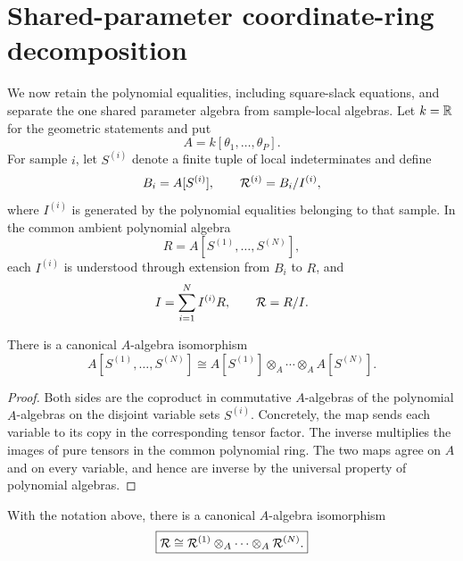 \section{Shared-parameter coordinate-ring decomposition}
\label{sec:coordinate-ring}

We now retain the polynomial equalities, including square-slack equations, and
separate the one shared parameter algebra from sample-local algebras.  Let
\(k=\mathbb{R}\) for the geometric statements and put
\begin{equation}
  A=k[\theta_1,\ldots,\theta_P].
\end{equation}
For sample \(i\), let \(S^{(i)}\) denote a finite tuple of local indeterminates
and define
\begin{equation}
  B_i=A[S^{(i)}],\qquad
  \mathcal{R}^{(i)}=B_i/I^{(i)},
\end{equation}
where \(I^{(i)}\) is generated by the polynomial equalities belonging to that
sample.  In the common ambient polynomial algebra
\begin{equation}
  R=A[S^{(1)},\ldots,S^{(N)}],
\end{equation}
each \(I^{(i)}\) is understood through extension from \(B_i\) to \(R\), and
\begin{equation}
  I=\sum_{i=1}^{N} I^{(i)}R,
  \qquad
  \mathcal{R}=R/I.
  \label{eq:global-ring}
\end{equation}

\begin{proposition}
\label{prop:ambient-tensor}
There is a canonical \(A\)-algebra isomorphism
\begin{equation}
  A[S^{(1)},\ldots,S^{(N)}]
  \cong
  A[S^{(1)}]\otimes_A\cdots\otimes_A A[S^{(N)}].
  \label{eq:ambient-tensor}
\end{equation}
\end{proposition}

\begin{proof}
Both sides are the coproduct in commutative \(A\)-algebras of the polynomial
\(A\)-algebras on the disjoint variable sets \(S^{(i)}\).  Concretely, the map
sends each variable to its copy in the corresponding tensor factor.  The
inverse multiplies the images of pure tensors in the common polynomial ring.
The two maps agree on \(A\) and on every variable, and hence are inverse by the
universal property of polynomial algebras.
\end{proof}

\begin{theorem}
\label{thm:quotient-tensor}
With the notation above, there is a canonical \(A\)-algebra isomorphism
\begin{equation}
  \boxed{
  \mathcal{R}\cong
  \mathcal{R}^{(1)}\otimes_A\cdots\otimes_A\mathcal{R}^{(N)}.}
  \label{eq:quotient-tensor}
\end{equation}
\end{theorem}

